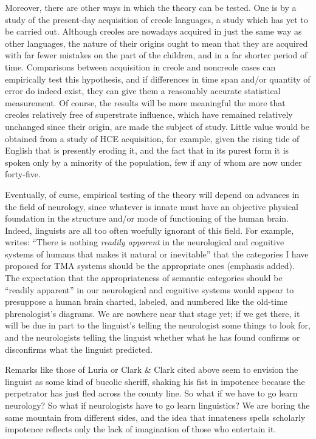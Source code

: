 Moreover, there are other ways in which the theory can be tested. One is by a study of the present-day acquisition of creole languages, a study which has yet to be carried out. Although creoles are nowadays acquired in just the same way as other languages, the nature of their origins ought to mean that they are acquired with far fewer mistakes on the part of the children, and in a far shorter period of time. Comparisons between acquisition in creole and noncreole cases can empirically test this hypothesis, and if differences in time span and/or quantity of error do indeed exist, they can give them a reasonably accurate statistical measurement. Of course, the results will be more meaningful the more that creoles relatively free of superstrate influence, which have remained relatively unchanged since their origin, are made the subject of study. Little value would be obtained from a study of HCE acquisition, for example, given the rising tide of English that is presently eroding it, and the fact that in its purest form it is spoken only by a minority of the population, few if any of whom are now under forty-five.


Eventually, of curse, empirical testing of the theory will depend on advances in the field of neurology, since whatever is innate must have an objective physical foundation in the structure and/or mode of functioning of the human brain. Indeed, linguists are all too often woefully ignorant of this field. For example, \citet{Alleyne1979} writes: ``There is nothing \textit{readily apparent} in the neurological and cognitive systems of humans that makes it natural or inevitable'' that the categories I have proposed for TMA systems should be the appropriate ones (emphasis added). The expectation that the appropriateness of semantic categories should be ``readily apparent'' in our neurological and cognitive systems would appear to presuppose a human brain charted, labeled, and numbered like the old-time phrenologist's diagrams. We are nowhere near that stage yet; if we get there, it will be due in part to the linguist's telling the neurologist some things to look for, and the neurologists telling the linguist whether what he has found confirms or disconfirms what the linguist predicted.

Remarks like those of Luria or Clark \& Clark cited above seem to envision the linguist as some kind of bucolic sheriff, shaking his fist in impotence because the perpetrator has just fled across the county line. So what if we have to go learn neurology? So what if neurologists have to go learn linguistics? We are boring the same mountain from different sides, and the idea that innateness spells scholarly impotence reflects only the lack of imagination of those who entertain it.

